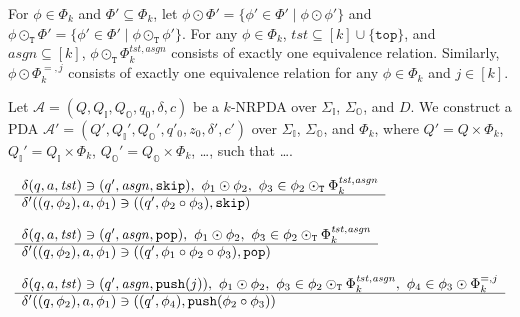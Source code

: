 \documentclass[oribibl,envcountsame,dvipdfmx]{llncs}
\newcommand{\TOP}{\mathtt{top}}
\newcommand{\COMP}{\circ}
\newcommand{\COMPBL}{\odot}
\newcommand{\COMPBLT}{\COMPBL_{\mathtt{T}}}
\newcommand{\TST}{\mathit{tst}}
\newcommand{\ASGN}{\mathit{asgn}}
\newcommand{\COM}{\mathit{com}}
\newcommand{\SKIP}{\mathtt{skip}}
\newcommand{\POP}{\mathtt{pop}}
\newcommand{\PUSH}{\mathtt{push}}
\newcommand{\calA}{\mathcal{A}}
\newcommand{\QI}{Q_{\mathbb{I}}}
\newcommand{\QO}{Q_{\mathbb{O}}}
\newcommand{\SigmaI}{\Sigma_{\mathbb{I}}}
\newcommand{\SigmaO}{\Sigma_{\mathbb{O}}}
\begin{document}
For $\phi\in\Phi_k$ and $\Phi'\subseteq\Phi_k$,
let $\phi\COMPBL\Phi' = \{\phi'\in\Phi' \mid \phi\COMPBL\phi'\}$
and $\phi\COMPBLT\Phi' = \{\phi'\in\Phi' \mid \phi\COMPBLT\phi'\}$.
For any $\phi\in\Phi_k$, $\TST\subseteq [k]\cup\{\TOP\}$,
and $\ASGN\subseteq[k]$,
$\phi\COMPBLT\Phi_k^{\TST,\ASGN}$ consists of exactly one equivalence relation.
Similarly,
$\phi\COMPBL\Phi_k^{=,j}$ consists of exactly one equivalence relation
for any $\phi\in\Phi_k$ and $j\in [k]$.

\bigskip

Let $\calA=(Q,\QI,\QO,q_0,\delta,c)$ be a $k$-NRPDA
over $\SigmaI$, $\SigmaO$, and $D$.
We construct a PDA
$\calA'=(Q',\QI',\QO',q'_0,z_0,\delta',c')$
over $\SigmaI$, $\SigmaO$, and $\Phi_k$,
where $Q'=Q\times\Phi_k$, $\QI'=\QI\times\Phi_k$, $\QO'=\QO\times\Phi_k$,
\ldots,
such that
\ldots.


\begin{align}
&
\begin{array}{l}
  \delta(q,a,\TST) \ni (q',\ASGN,\SKIP), \
  \phi_1\COMPBL\phi_2, \
  \phi_3\in \phi_2\COMPBLT\Phi_k^{\TST,\ASGN}
  \\ \hline
  \delta'((q,\phi_2),a,\phi_1) \ni ((q',\phi_2\COMP\phi_3),\SKIP)
\end{array}
%
\\[\medskipamount]
&
\begin{array}{l}
  \delta(q,a,\TST) \ni (q',\ASGN,\POP), \
  \phi_1\COMPBL\phi_2, \
  \phi_3\in \phi_2\COMPBLT\Phi_k^{\TST,\ASGN}
  \\ \hline
  \delta'((q,\phi_2),a,\phi_1) \ni ((q',\phi_1\COMP\phi_2\COMP\phi_3),\POP)
\end{array}
%
\\[\medskipamount]
&
\begin{array}{l}
  \delta(q,a,\TST) \ni (q',\ASGN,\PUSH(j)), \
  \phi_1\COMPBL\phi_2, \
  \phi_3\in \phi_2\COMPBLT\Phi_k^{\TST,\ASGN}, \
  \phi_4\in \phi_3\COMPBL\Phi_k^{=,j}
  \\ \hline
  \delta'((q,\phi_2),a,\phi_1) \ni ((q',\phi_4),\PUSH(\phi_2\COMP\phi_3))
\end{array}
%
\end{align}
\end{document}
